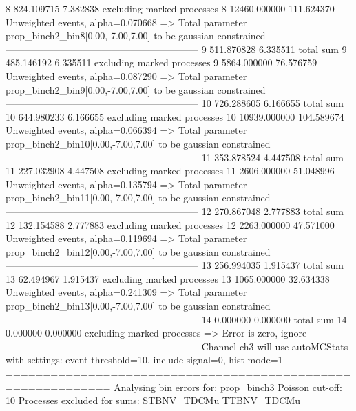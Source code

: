 8          824.109715      7.382838        excluding marked processes    
8          12460.000000    111.624370      Unweighted events, alpha=0.070668
  => Total parameter prop_binch2_bin8[0.00,-7.00,7.00] to be gaussian constrained
------------------------------------------------------------
9          511.870828      6.335511        total sum                     
9          485.146192      6.335511        excluding marked processes    
9          5864.000000     76.576759       Unweighted events, alpha=0.087290
  => Total parameter prop_binch2_bin9[0.00,-7.00,7.00] to be gaussian constrained
------------------------------------------------------------
10         726.288605      6.166655        total sum                     
10         644.980233      6.166655        excluding marked processes    
10         10939.000000    104.589674      Unweighted events, alpha=0.066394
  => Total parameter prop_binch2_bin10[0.00,-7.00,7.00] to be gaussian constrained
------------------------------------------------------------
11         353.878524      4.447508        total sum                     
11         227.032908      4.447508        excluding marked processes    
11         2606.000000     51.048996       Unweighted events, alpha=0.135794
  => Total parameter prop_binch2_bin11[0.00,-7.00,7.00] to be gaussian constrained
------------------------------------------------------------
12         270.867048      2.777883        total sum                     
12         132.154588      2.777883        excluding marked processes    
12         2263.000000     47.571000       Unweighted events, alpha=0.119694
  => Total parameter prop_binch2_bin12[0.00,-7.00,7.00] to be gaussian constrained
------------------------------------------------------------
13         256.994035      1.915437        total sum                     
13         62.494967       1.915437        excluding marked processes    
13         1065.000000     32.634338       Unweighted events, alpha=0.241309
  => Total parameter prop_binch2_bin13[0.00,-7.00,7.00] to be gaussian constrained
------------------------------------------------------------
14         0.000000        0.000000        total sum                     
14         0.000000        0.000000        excluding marked processes    
  => Error is zero, ignore      
------------------------------------------------------------
Channel ch3 will use autoMCStats with settings: event-threshold=10, include-signal=0, hist-mode=1
============================================================
Analysing bin errors for: prop_binch3
Poisson cut-off: 10
Processes excluded for sums: STBNV_TDCMu TTBNV_TDCMu
